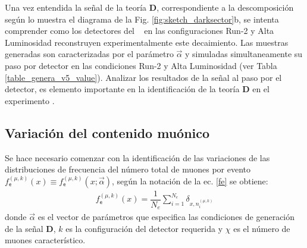 
Una vez entendida la señal de la teoría \MSSM\textbf{D}, correspondiente a la descomposición según lo muestra el diagrama de la Fig. \ref{fig:sketch_darksector}b, se intenta comprender como los detectores del \CMS ~ en las configuraciones Run-2 y Alta Luminosidad reconstruyen experimentalmente este decaimiento. Las muestras generadas son caracterizadas por el parámetro $\vec{\alpha}$ y simuladas simultaneamente su paso por detector en las condiciones Run-2 y Alta Luminosidad (ver Tabla \ref{table_genera_v5_value}). Analizar los resultados de la señal al paso por el detector, es elemento importante en la identificación de la teoría \MSSM\textbf{D} en el experimento \CMS.

\subsection{Variación del contenido muónico}

Se hace necesario comenzar con la identificación de las variaciones de las distribuciones de frecuencia del número total de muones por evento $f^{(\mu, k)}_\textsf{e} (x) \equiv f^{(\mu, k)}_\textsf{e} (x; \vec{\alpha})$, según la notación de la ec. \ref{fe} se obtiene:
\begin{eqnarray}
f^{(\mu, k)}_\textsf{e} (x) = \dfrac{1}{N_e}\sum_{i=1}^{N_e} \delta_{x, n_i^{(\mu,k)}}
\end{eqnarray}
donde $\vec{\alpha}$ es el vector de parámetros que especifica las condiciones de generación de la señal \MSSM\textbf{D}, $k$ es la configuración del detector requerida y $\chi$ es el número de muones característico.

